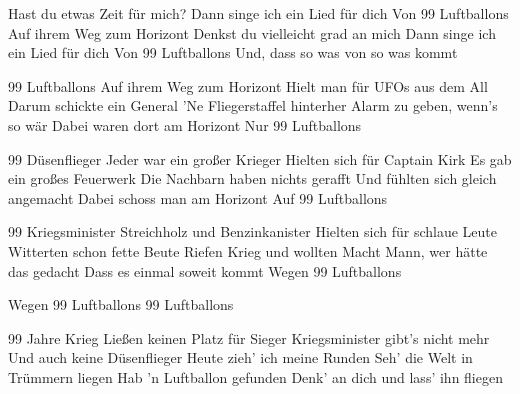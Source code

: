 \begin{verse*}
Hast du etwas Zeit für mich?
Dann singe ich ein Lied für dich
Von 99 Luftballons
Auf ihrem Weg zum Horizont
Denkst du vielleicht grad an mich
Dann singe ich ein Lied für dich
Von 99 Luftballons
Und, dass so was von so was kommt
\end{verse*}

\begin{verse*}
99 Luftballons
Auf ihrem Weg zum Horizont
Hielt man für UFOs aus dem All
Darum schickte ein General
'Ne Fliegerstaffel hinterher
Alarm zu geben, wenn's so wär
Dabei waren dort am Horizont
Nur 99 Luftballons
\end{verse*}

\begin{verse*}
99 Düsenflieger
Jeder war ein großer Krieger
Hielten sich für Captain Kirk
Es gab ein großes Feuerwerk
Die Nachbarn haben nichts gerafft
Und fühlten sich gleich angemacht
Dabei schoss man am Horizont
Auf 99 Luftballons
\end{verse*}

\begin{verse*}
99 Kriegsminister
Streichholz und Benzinkanister
Hielten sich für schlaue Leute
Witterten schon fette Beute
Riefen Krieg und wollten Macht
Mann, wer hätte das gedacht
Dass es einmal soweit kommt
Wegen 99 Luftballons
\end{verse*}

\begin{verse*}
Wegen 99 Luftballons
99 Luftballons
\end{verse*}

\begin{verse*}
99 Jahre Krieg
Ließen keinen Platz für Sieger
Kriegsminister gibt's nicht mehr
Und auch keine Düsenflieger
Heute zieh' ich meine Runden
Seh' die Welt in Trümmern liegen
Hab 'n Luftballon gefunden
Denk' an dich und lass' ihn fliegen
\end{verse*}

